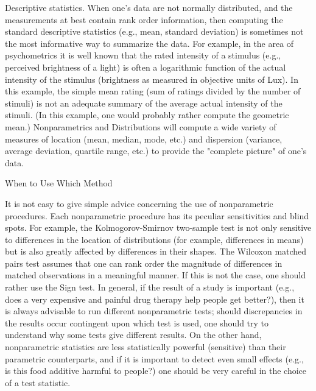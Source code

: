 Descriptive statistics. When one's data are not normally distributed, and the measurements at best contain rank order information, then computing the standard descriptive statistics (e.g., mean, standard deviation) is sometimes not the most informative way to summarize the data. For example, in the area of psychometrics it is well known that the rated intensity of a stimulus (e.g., perceived brightness of a light) is often a logarithmic function of the actual intensity of the stimulus (brightness as measured in objective units of Lux). In this example, the simple mean rating (sum of ratings divided by the number of stimuli) is not an adequate summary of the average actual intensity of the stimuli. (In this example, one would probably rather compute the geometric mean.) Nonparametrics and Distributions will compute a wide variety of measures of location (mean, median, mode, etc.) and dispersion (variance, average deviation, quartile range, etc.) to provide the "complete picture" of one's data.


When to Use Which Method

It is not easy to give simple advice concerning the use of nonparametric procedures. 
Each nonparametric procedure has its peculiar sensitivities and blind spots. For example, the Kolmogorov-Smirnov two-sample test is not only sensitive to differences in the location of distributions (for example, differences in means) but is also greatly affected by differences in their shapes. The Wilcoxon matched pairs test assumes that one can rank order the magnitude of differences in matched observations in a meaningful manner. If this is not the case, one should rather use the Sign test. In general, if the result of a study is important (e.g., does a very expensive and painful drug therapy help people get better?), then it is always advisable to run different nonparametric tests; should discrepancies in the results occur contingent upon which test is used, one should try to understand why some tests give different results. On the other hand, nonparametric statistics are less statistically powerful (sensitive) than their parametric counterparts, and if it is important to detect even small effects (e.g., is this food additive harmful to people?) one should be very careful in the choice of a test statistic.

